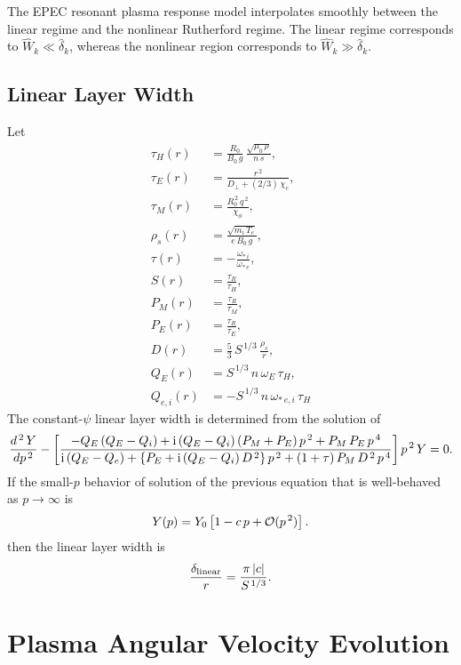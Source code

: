 \documentclass[notitlepage,12pt]{article}
\begin{document}
The EPEC resonant plasma response model interpolates smoothly
between the linear regime and the
nonlinear Rutherford regime. The linear regime corresponds to $\hat{W}_k\ll\hat{\delta}_k$, whereas the nonlinear
region corresponds to $\hat{W}_k\gg\hat{\delta}_k$.  

\subsection{Linear Layer Width}\label{linear}
Let
\begin{align}
\tau_H(r) &= \frac{R_0}{B_0\,g}\,\frac{\sqrt{\mu_0\,\rho}}{n\,s},\\[0.5ex]
\tau_E(r) &= \frac{r^{\,2}}{D_\perp + (2/3)\,\chi_e},\\[0.5ex]
\tau_M(r) &= \frac{R_0^{\,2}\,q^{\,2}}{\chi_\phi},\\[0.5ex]
\rho_s (r)&= \frac{\sqrt{m_i\,T_e}}{e\,B_0\,g},\\[0.5ex]
\tau(r)& = -\frac{\omega_{\ast\,i}}{\omega_{\ast\,e}},\\[0.5ex]
S(r) &= \frac{\tau_R}{\tau_H},\\[0.5ex]
P_M(r) &= \frac{\tau_R}{\tau_M},\\[0.5ex]
P_E(r) &= \frac{\tau_R}{\tau_E},\\[0.5ex]
D(r)&= \frac{5}{3}\,S^{\,1/3}\,\frac{\rho_s}{r},\\[0.5ex]
Q_E(r)&= S^{\,1/3}\,n\,\omega_E\,\tau_H,\\[0.5ex]
Q_{e,i}(r)&= -S^{\,1/3}\,n\,\omega_{\ast\,e,i}\,\tau_H
\end{align}
The constant-$\psi$ linear layer width is determined from the solution of
\begin{equation}
\frac{d^{\,2}\,Y}{dp^{\,2}} -\left[\frac{-Q_E\,(Q_E-Q_i)+{\rm i}\,(Q_E-Q_i)\,(P_M+P_E)\,p^{\,2}+
P_M\,P_E\,p^{\,4}}
{{\rm i}\,(Q_E-Q_e) +\{P_E + {\rm i}\,(Q_E-Q_i)\,D^{\,2}\}\,p^{\,2}+(1+\tau)\,P_M\,D^{\,2}\,p^{\,4}}
\right] p^{\,2}\, Y = 0.
\end{equation}
If the small-$p$ behavior of solution of the previous equation that is well-behaved as $p\rightarrow \infty$ is
\begin{equation}
Y(p) = Y_0\left[1 - c\,p+{\cal O}(p^{\,2})\right].
\end{equation}
then the 
linear layer width is 
\begin{equation}
\frac{\delta_{\rm linear}}{r} = \frac{\pi\,|c|}{S^{\,1/3}}.
\end{equation}


\section{Plasma Angular Velocity Evolution}\label{a4}
\end{document}

